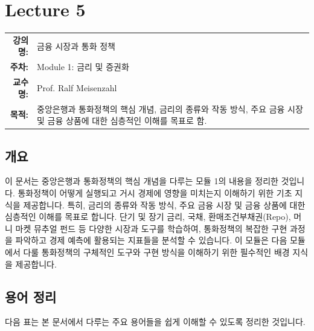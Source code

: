 \documentclass[11pt,a4paper]{book}
\makeatletter
\theoremstyle{definition}
\newcommand{\metainfo}[4]{
\begin{tcolorbox}[
    colback=lightpurple,
    colframe=darkpurple,
    boxrule=1pt,
    arc=2mm,
    left=10pt,
    right=10pt,
    top=8pt,
    bottom=8pt
]
\begin{tabular}{@{}rl@{}}
\textbf{강의명:} & #1 \\[0.3em]
\textbf{주차:} & #2 \\[0.3em]
\textbf{교수명:} & #3 \\[0.3em]
\textbf{목적:} & \begin{minipage}[t]{0.75\textwidth}#4\end{minipage}
\end{tabular}
\end{tcolorbox}
}
\makeatother
\begin{document}
\chapter{Lecture 5}
\label{ch:module5}

\metainfo{금융 시장과 통화 정책}{Module 1: 금리 및 증권화}{Prof. Ralf Meisenzahl}{중앙은행과 통화정책의 핵심 개념, 금리의 종류와 작동 방식, 주요 금융 시장 및 금융 상품에 대한 심층적인 이해를 목표로 함.}


\section{개요}
이 문서는 중앙은행과 통화정책의 핵심 개념을 다루는 모듈 1의 내용을 정리한 것입니다.
통화정책이 어떻게 실행되고 거시 경제에 영향을 미치는지 이해하기 위한 기초 지식을 제공합니다.
특히, 금리의 종류와 작동 방식, 주요 금융 시장 및 금융 상품에 대한 심층적인 이해를 목표로 합니다.
단기 및 장기 금리, 국채, 환매조건부채권(Repo), 머니 마켓 뮤추얼 펀드 등 다양한 시장과 도구를 학습하여,
통화정책의 복잡한 구현 과정을 파악하고 경제 예측에 활용되는 지표들을 분석할 수 있습니다.
이 모듈은 다음 모듈에서 다룰 통화정책의 구체적인 도구와 구현 방식을 이해하기 위한 필수적인 배경 지식을 제공합니다.


\section{용어 정리}
다음 표는 본 문서에서 다루는 주요 용어들을 쉽게 이해할 수 있도록 정리한 것입니다.
\end{document}
